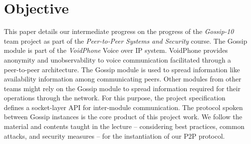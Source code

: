 \section{Objective}\label{sec:objective2}

This paper details our intermediate progress on the progress of the \textit{Gossip-10} team project as part of the
\textit{Peer-to-Peer Systems and Security} course.
The Gossip module is part of the \textit{VoidPhone} Voice over IP system.
VoidPhone provides anonymity and unobservability to voice communication facilitated through a peer-to-peer architecture.
The Gossip module is used to spread information like availability information among communicating peers.
Other modules from other teams might rely on the Gossip module to spread information required for their operations
through the network.
For this purpose, the project specification defines a socket-layer API for inter-module communication.
The protocol spoken between Gossip instances is the core product of this project work.
We follow the material and contents taught in the lecture -- considering best practices, common attacks, and security measures --
for the instantiation of our P2P protocol.
